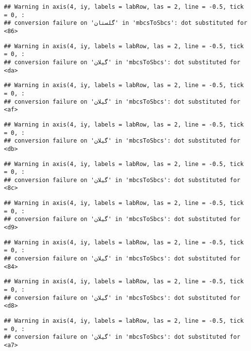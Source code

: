\documentclass[
]{article}
\begin{document}
\begin{verbatim}
## Warning in axis(4, iy, labels = labRow, las = 2, line = -0.5, tick = 0, :
## conversion failure on 'گلستان' in 'mbcsToSbcs': dot substituted for <86>
\end{verbatim}

\begin{verbatim}
## Warning in axis(4, iy, labels = labRow, las = 2, line = -0.5, tick = 0, :
## conversion failure on 'گیلان' in 'mbcsToSbcs': dot substituted for <da>
\end{verbatim}

\begin{verbatim}
## Warning in axis(4, iy, labels = labRow, las = 2, line = -0.5, tick = 0, :
## conversion failure on 'گیلان' in 'mbcsToSbcs': dot substituted for <af>
\end{verbatim}

\begin{verbatim}
## Warning in axis(4, iy, labels = labRow, las = 2, line = -0.5, tick = 0, :
## conversion failure on 'گیلان' in 'mbcsToSbcs': dot substituted for <db>
\end{verbatim}

\begin{verbatim}
## Warning in axis(4, iy, labels = labRow, las = 2, line = -0.5, tick = 0, :
## conversion failure on 'گیلان' in 'mbcsToSbcs': dot substituted for <8c>
\end{verbatim}

\begin{verbatim}
## Warning in axis(4, iy, labels = labRow, las = 2, line = -0.5, tick = 0, :
## conversion failure on 'گیلان' in 'mbcsToSbcs': dot substituted for <d9>
\end{verbatim}

\begin{verbatim}
## Warning in axis(4, iy, labels = labRow, las = 2, line = -0.5, tick = 0, :
## conversion failure on 'گیلان' in 'mbcsToSbcs': dot substituted for <84>
\end{verbatim}

\begin{verbatim}
## Warning in axis(4, iy, labels = labRow, las = 2, line = -0.5, tick = 0, :
## conversion failure on 'گیلان' in 'mbcsToSbcs': dot substituted for <d8>
\end{verbatim}

\begin{verbatim}
## Warning in axis(4, iy, labels = labRow, las = 2, line = -0.5, tick = 0, :
## conversion failure on 'گیلان' in 'mbcsToSbcs': dot substituted for <a7>
\end{verbatim}
\end{document}
